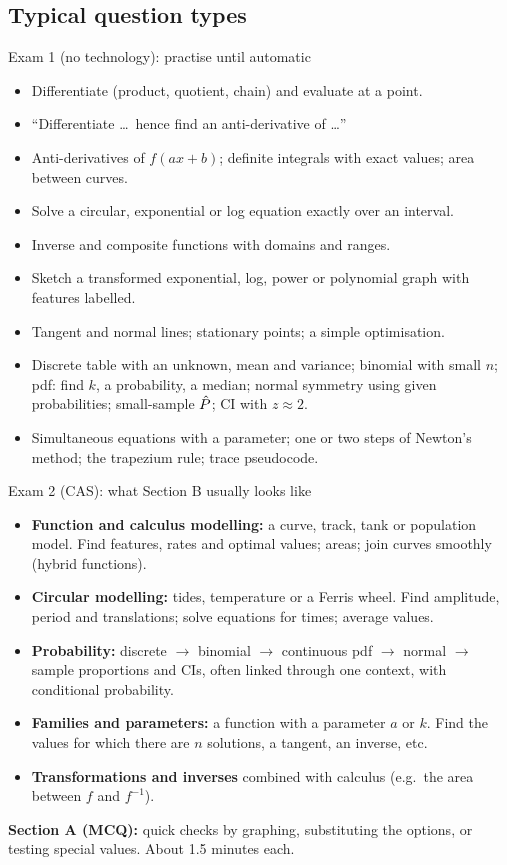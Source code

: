 \subsection{Typical question types}

\begin{cols}
\begin{keyres}{Exam 1 (no technology): practise until automatic}
\begin{itemize}
  \item Differentiate (product, quotient, chain) and evaluate at a point.
  \item ``Differentiate \dots\ hence find an anti-derivative of \dots''
  \item Anti-derivatives of $f(ax+b)$; definite integrals with exact values; area between curves.
  \item Solve a circular, exponential or log equation exactly over an interval.
  \item Inverse and composite functions with domains and ranges.
  \item Sketch a transformed exponential, log, power or polynomial graph with features labelled.
  \item Tangent and normal lines; stationary points; a simple optimisation.
  \item Discrete table with an unknown, mean and variance; binomial with small $n$; pdf: find $k$, a probability, a median; normal symmetry using given probabilities; small-sample $\hat{P}$; CI with $z\approx2$.
  \item Simultaneous equations with a parameter; one or two steps of Newton's method; the trapezium rule; trace pseudocode.
\end{itemize}
\end{keyres}
\nextcol
\begin{keyres}{Exam 2 (CAS): what Section B usually looks like}
\begin{itemize}
  \item \textbf{Function and calculus modelling:} a curve, track, tank or population model. Find features, rates and optimal values; areas; join curves smoothly (hybrid functions).
  \item \textbf{Circular modelling:} tides, temperature or a Ferris wheel. Find amplitude, period and translations; solve equations for times; average values.
  \item \textbf{Probability:} discrete $\to$ binomial $\to$ continuous pdf $\to$ normal $\to$ sample proportions and CIs, often linked through one context, with conditional probability.
  \item \textbf{Families and parameters:} a function with a parameter $a$ or $k$. Find the values for which there are $n$ solutions, a tangent, an inverse, etc.
  \item \textbf{Transformations and inverses} combined with calculus (e.g.\ the area between $f$ and $f^{-1}$).
\end{itemize}
\textbf{Section A (MCQ):} quick checks by graphing, substituting the options, or testing special values. About 1.5 minutes each.
\end{keyres}
\end{cols}

